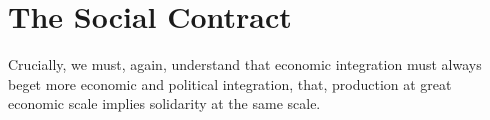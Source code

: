 







	
\section{The Social Contract}


Crucially, we must, again, understand that economic integration must always beget more economic and political integration, that, production at great economic scale implies solidarity at the same scale.

